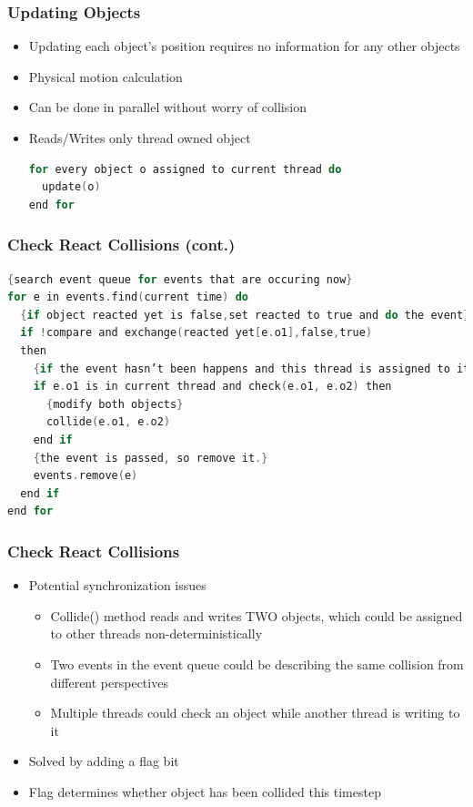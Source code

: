 \documentclass{beamer}
\begin{document}
\begin{frame}[fragile]
	\frametitle{Updating Objects}
	\begin{itemize}
		\item Updating each object's position requires no information for any other objects
		\item Physical motion calculation
		\item Can be done in parallel without worry of collision
		\item Reads/Writes only thread owned object
	\begin{lstlisting}[language=C,basicstyle=\footnotesize,frame=single,tabsize=4,title=Update]
for every object o assigned to current thread do
  update(o)
end for
	\end{lstlisting}
	\end{itemize}
\end{frame}
\begin{frame}[fragile]
	\frametitle{Check React Collisions (cont.)}
	\begin{lstlisting}[language=C,basicstyle=\footnotesize,frame=single,tabsize=4,title=Check\_React\_Collisions]
{search event queue for events that are occuring now}
for e in events.find(current time) do
  {if object reacted yet is false,set reacted to true and do the event}
  if !compare and exchange(reacted yet[e.o1],false,true)
  then
    {if the event hasn’t been happens and this thread is assigned to it}
    if e.o1 is in current thread and check(e.o1, e.o2) then
      {modify both objects}
      collide(e.o1, e.o2)
    end if
    {the event is passed, so remove it.}
    events.remove(e)
  end if
end for
	\end{lstlisting}
\end{frame}
\begin{frame}
	\frametitle{Check React Collisions}
	\begin{itemize}
		\item Potential synchronization issues
		\begin{itemize}
			\item Collide() method reads and writes TWO objects, which could be assigned to other threads non-deterministically
			\item Two events in the event queue could be describing the same collision from different perspectives
			\item Multiple threads could check an object while another thread is writing to it
		\end{itemize}
		\item Solved by adding a flag bit
		\item Flag determines whether object has been collided this timestep
	\end{itemize}
\end{frame}
\end{document}
